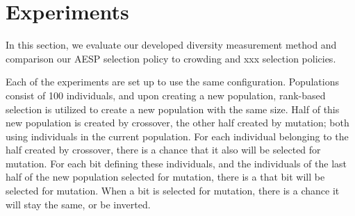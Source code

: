 \section{Experiments}
In this section, we evaluate our developed diversity measurement method and comparison our AESP selection policy to crowding and xxx selection policies.

Each of the experiments are set up to use the same configuration. Populations consist of \num{100} individuals, and upon creating a new population, rank-based selection is utilized to create a new population with the same size. Half of this new population is created by crossover, the other half created by mutation; both using individuals in the current population. For each individual belonging to the half created by crossover, there is a  chance that it also will be selected for mutation. For each bit defining these individuals, and the individuals of the last half of the new population selected for mutation, there is a  that bit will be selected for mutation. When a bit is selected for mutation, there is a  chance it will stay the same, or be inverted.



